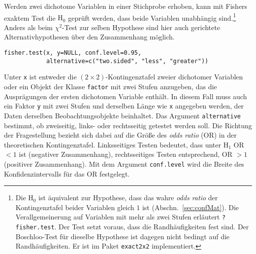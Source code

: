 Werden zwei dichotome Variablen in einer Stichprobe erhoben, kann mit Fishers exaktem Test die $\text{H}_{0}$ geprüft werden, dass beide Variablen unabhängig sind.\footnote{\label{ftn:oddsRatio}Die $\text{H}_{0}$ ist äquivalent zur Hypothese, dass das wahre \emph{odds ratio} der Kontingenztafel beider Variablen gleich $1$ ist (Abschn.\ \ref{sec:confMat}). Die Verallgemeinerung auf Variablen mit mehr als zwei Stufen erläutert \lstinline!?fisher.test!. Der Test setzt voraus, dass die Randhäufigkeiten fest sind. Der  Boschloo-Test für dieselbe Hypothese ist dagegen nicht bedingt auf die Randhäufigkeiten. Er ist im Paket \lstinline!exact2x2! \cite{Fay2024} implementiert.} Anders als beim $\chi^{2}$-Test zur selben Hypothese sind hier auch gerichtete Alternativhypothesen über den Zusammenhang möglich.
\begin{lstlisting}
fisher.test(x, y=NULL, conf.level=0.95,
            alternative=c("two.sided", "less", "greater"))
\end{lstlisting}

Unter \lstinline!x! ist entweder die $(2 \times 2)$-Kontingenztafel zweier dichotomer Variablen oder ein Objekt der Klasse \lstinline!factor! mit zwei Stufen anzugeben, das die Ausprägungen der ersten dichotomen Variable enthält. In diesem Fall muss auch ein Faktor \lstinline!y! mit zwei Stufen und derselben Länge wie \lstinline!x! angegeben werden, der Daten derselben Beobachtungsobjekte beinhaltet. Das Argument \lstinline!alternative! bestimmt, ob zweiseitig, links- oder rechtsseitig getestet werden soll. Die Richtung der Fragestellung bezieht sich dabei auf die Größe des \emph{odds ratio} (OR) in der theoretischen Kontingenztafel. Linksseitiges Testen bedeutet, dass unter $\text{H}_{1}$ OR $< 1$ ist (negativer Zusammenhang), rechtsseitiges Testen entsprechend, OR $> 1$ (positiver Zusammenhang). Mit dem Argument \lstinline!conf.level! wird die Breite des Konfidenzintervalls für das OR festgelegt.

